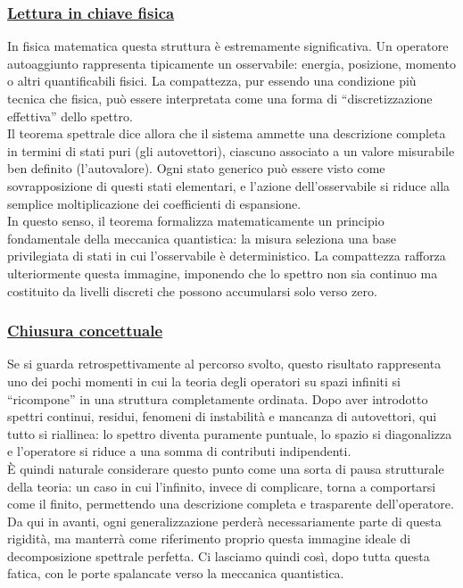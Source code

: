 \documentclass[a4paper,12pt]{report}
\begin{document}
\subsubsection{\underline{Lettura in chiave fisica}}

In fisica matematica questa struttura è estremamente significativa. Un operatore autoaggiunto rappresenta tipicamente un osservabile: energia, posizione, momento o altri quantificabili fisici. La compattezza, pur essendo una condizione più tecnica che fisica, può essere interpretata come una forma di “discretizzazione effettiva” dello spettro.
\\Il teorema spettrale dice allora che il sistema ammette una descrizione completa in termini di stati puri (gli autovettori), ciascuno associato a un valore misurabile ben definito (l’autovalore). Ogni stato generico può essere visto come sovrapposizione di questi stati elementari, e l’azione dell’osservabile si riduce alla semplice moltiplicazione dei coefficienti di espansione.
\\In questo senso, il teorema formalizza matematicamente un principio fondamentale della meccanica quantistica: la misura seleziona una base privilegiata di stati in cui l’osservabile è deterministico. La compattezza rafforza ulteriormente questa immagine, imponendo che lo spettro non sia continuo ma costituito da livelli discreti che possono accumularsi solo verso zero.

\newpage

\subsubsection{\underline{Chiusura concettuale}}

Se si guarda retrospettivamente al percorso svolto, questo risultato rappresenta uno dei pochi momenti in cui la teoria degli operatori su spazi infiniti si “ricompone” in una struttura completamente ordinata. Dopo aver introdotto spettri continui, residui, fenomeni di instabilità e mancanza di autovettori, qui tutto si riallinea: lo spettro diventa puramente puntuale, lo spazio si diagonalizza e l’operatore si riduce a una somma di contributi indipendenti.
\\È quindi naturale considerare questo punto come una sorta di pausa strutturale della teoria: un caso in cui l’infinito, invece di complicare, torna a comportarsi come il finito, permettendo una descrizione completa e trasparente dell’operatore.
\\Da qui in avanti, ogni generalizzazione perderà necessariamente parte di questa rigidità, ma manterrà come riferimento proprio questa immagine ideale di decomposizione spettrale perfetta. Ci lasciamo quindi così, dopo tutta questa fatica, con le porte spalancate verso la meccanica quantistica.
\end{document}
